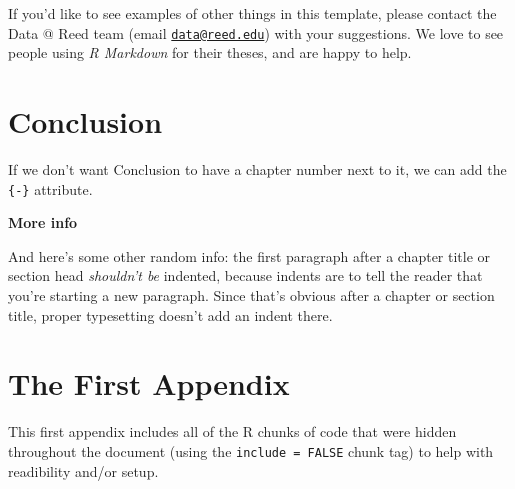 \documentclass [11pt, proquest] {uwthesis}[2015/03/03]
\begin{document}
If you'd like to see examples of other things in this template, please
contact the Data @ Reed team (email
\href{mailto:data@reed.edu}{\nolinkurl{data@reed.edu}}) with your
suggestions. We love to see people using \emph{R Markdown} for their
theses, and are happy to help.

\chapter*{Conclusion}\label{conclusion}

If we don't want Conclusion to have a chapter number next to it, we can
add the \texttt{\{-\}} attribute.

\textbf{More info}

And here's some other random info: the first paragraph after a chapter
title or section head \emph{shouldn't be} indented, because indents are
to tell the reader that you're starting a new paragraph. Since that's
obvious after a chapter or section title, proper typesetting doesn't add
an indent there.

\appendix

\chapter{The First Appendix}\label{the-first-appendix}

This first appendix includes all of the R chunks of code that were
hidden throughout the document (using the \texttt{include\ =\ FALSE}
chunk tag) to help with readibility and/or setup.
\end{document}
